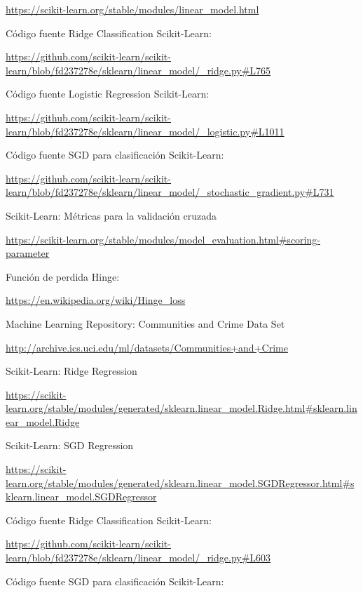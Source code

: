 \documentclass[12pt, spanish]{article}
\begin{document}
\begin{thebibliography}{9}
\url{https://scikit-learn.org/stable/modules/linear_model.html}


Código fuente Ridge Classification Scikit-Learn:

\url{https://github.com/scikit-learn/scikit-learn/blob/fd237278e/sklearn/linear_model/_ridge.py#L765}



Código fuente Logistic Regression Scikit-Learn:

\url{https://github.com/scikit-learn/scikit-learn/blob/fd237278e/sklearn/linear_model/_logistic.py#L1011}



Código fuente SGD para clasificación Scikit-Learn:

\url{https://github.com/scikit-learn/scikit-learn/blob/fd237278e/sklearn/linear_model/_stochastic_gradient.py#L731}



Scikit-Learn: Métricas para la validación cruzada

\url{https://scikit-learn.org/stable/modules/model_evaluation.html#scoring-parameter}


Función de perdida Hinge:

\url{https://en.wikipedia.org/wiki/Hinge_loss}


Machine Learning Repository: Communities and Crime Data Set  

\url{http://archive.ics.uci.edu/ml/datasets/Communities+and+Crime}




Scikit-Learn: Ridge Regression

\url{https://scikit-learn.org/stable/modules/generated/sklearn.linear_model.Ridge.html#sklearn.linear_model.Ridge}

Scikit-Learn: SGD Regression

\url{https://scikit-learn.org/stable/modules/generated/sklearn.linear_model.SGDRegressor.html#sklearn.linear_model.SGDRegressor}



Código fuente Ridge Classification Scikit-Learn:

\url{https://github.com/scikit-learn/scikit-learn/blob/fd237278e/sklearn/linear_model/_ridge.py#L603}



Código fuente SGD para clasificación Scikit-Learn:


\end{thebibliography}
\end{document}

